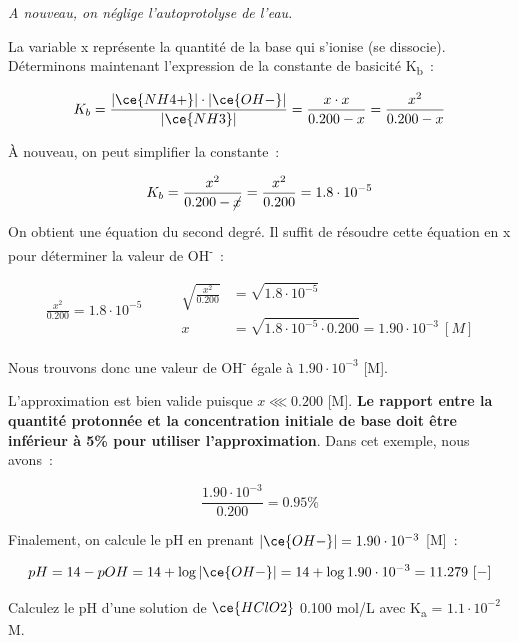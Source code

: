 \documentclass[
  11pt,
  a4paper,
  openany]{book}
\begin{document}
\emph{A nouveau, on néglige l'autoprotolyse de l'eau.}

La variable x représente la quantité de la base qui s'ionise (se dissocie). Déterminons maintenant l'expression de la constante de basicité K\textsubscript{b}~:

\[
K_b = \frac{|\ce{NH4+}| \cdot |\ce{OH-}|}{|\ce{NH3}|} = \frac{x \cdot x}{0.200 - x} = \frac{x^2}{0.200 - x}
\]

À nouveau, on peut simplifier la constante~:

\[
K_b = \frac{x^2}{0.200 - \cancel{x}} = \frac{x^2}{0.200} = 1.8 \cdot 10^{-5}
\]

On obtient une équation du second degré. Il suffit de résoudre cette équation en x pour déterminer la valeur de \textbar OH\textsuperscript{-}\textbar~:

\[
\begin{split}
\frac{x^2}{0.200} = 1.8 \cdot 10^{-5}
\end{split}
\qquad
\begin{split}
\sqrt{\frac{x^2}{0.200}} &= \sqrt{1.8 \cdot 10^{-5}} \\
x &= \sqrt{1.8 \cdot 10^{-5} \cdot 0.200} = 1.90 \cdot 10^{-3}\ [M]
\end{split}
\]

Nous trouvons donc une valeur de \textbar OH\textsuperscript{-}\textbar{} égale à \(1.90 \cdot 10^{-3}\) {[}M{]}.

L'approximation est bien valide puisque \(x \lll 0.200\) {[}M{]}. \textbf{Le rapport entre la quantité protonnée et la concentration initiale de base doit être inférieur à 5\% pour utiliser l'approximation}. Dans cet exemple, nous avons~:

\[
\frac{1.90 \cdot 10^{-3}}{0.200} = 0.95\%
\]

Finalement, on calcule le pH en prenant \(|\ce{OH-}| = 1.90 \cdot 10^{-3}\) {[}M{]}~:

\[
pH = 14 - pOH = 14 + \log |\ce{OH-}| = 14 + \log 1.90 \cdot 10^{-3} = 11.279\ [-]
\]

\begin{Exercise}
Calculez le pH d'une solution de \(\ce{HClO2}\) 0.100 mol/L avec K\textsubscript{a} = \(1.1 \cdot 10^{-2}\) M.

\end{Exercise}
\end{document}
